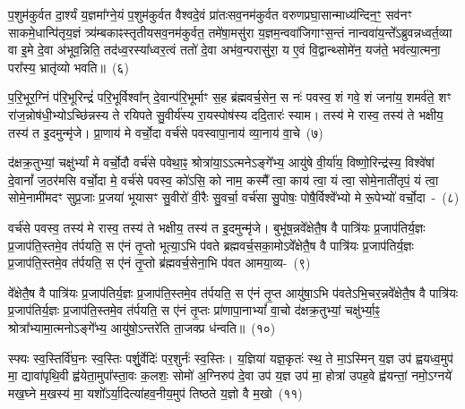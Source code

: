 प॒शुम॑कुर्वत दा॒र्श्यं य॒ज्ञमा᳚ग्ने॒यं प॒शुम॑कुर्वत वैश्वदे॒वं प्रा॑तःसव॒नम॑कुर्वत वरुणप्रघा॒सान्माध्य॑न्दिन॒ꣳ॒ सव॑नꣳ साक\-मे॒धान्पि॑तृय॒ज्ञं त्र्य॑म्बकाꣴस्तृतीयसव॒नम॑कुर्वत॒ तमे॑षा॒मसु॑रा य॒ज्ञम॒न्व\-वा॑जिगाꣳ\-स॒न्तं नान्ववा॑य॒न्ते᳚\-ऽब्रुवन्नध्वर्त॒व्या वा इ॒मे दे॒वा अ॑भूव॒न्निति॒ तद॑ध्व॒रस्या᳚ध्वर॒त्वं ततो॑ दे॒वा अभ॑व॒न्परासु॑रा॒ य ए॒वं वि॒द्वान्थ्सोमे॑न॒ यज॑ते॒ भव॑त्या॒त्मना॒ परा᳚स्य॒ भ्रातृ॑व्यो भवति॥~(६)

{\anuvakamend[{अप॑श्यन्तो\-ऽग्नीषो॒मीय॑मा॒त्मना॒ परा॒ त्रीणि॑ च}]}%

प॒रि॒भूर॒ग्निं प॑रि॒भूरिन्द्रं॑ परि॒भूर्विश्वा᳚न् दे॒वान्प॑रि॒भूर्माꣳ स॒ह ब्र॑ह्मवर्च॒सेन॒ स नः॑ पवस्व॒ शं गवे॒ शं जना॑य॒ शमर्व॑ते॒ शꣳ रा॑ज॒न्नोष॑धी॒भ्यो\-ऽच्छि॑न्नस्य ते रयिपते सु॒वीर्य॑स्य रा॒यस्पोष॑स्य ददि॒तारः॑ स्याम। तस्य॑ मे रास्व॒ तस्य॑ ते भक्षीय॒ तस्य॑ त इ॒दमुन्मृ॑जे। प्रा॒णाय॑ मे वर्चो॒दा वर्च॑से पवस्वापा॒नाय॑ व्या॒नाय॑ वा॒चे~(७)

द॑क्षक्र॒तुभ्यां॒ चक्षु॑र्भ्यां मे वर्चो॒दौ वर्च॑से पवेथा॒ꣴ॒ श्रोत्रा॑या॒\-ऽऽ\-\-त्मने\-ऽङ्गे᳚भ्य॒ आयु॑षे वी॒र्या॑य॒ विष्णो॒रिन्द्र॑स्य॒ विश्वे॑षां दे॒वानां᳚ ज॒ठर॑मसि वर्चो॒दा मे॒ वर्च॑से पवस्व॒ को॑\-ऽसि॒ को नाम॒ कस्मै᳚ त्वा॒ काय॑ त्वा॒ यं त्वा॒ सोमे॒नाती॑तृपं॒ यं त्वा॒ सोमे॒नामी॑मदꣳ सुप्र॒जाः प्र॒जया॑ भूयासꣳ सु॒वीरो॑ वी॒रैः सु॒वर्चा॒ वर्च॑सा सु॒पोषः॒ पोषै॒र्विश्वे᳚भ्यो मे रू॒पेभ्यो॑ वर्चो॒दा~-~(८)

वर्च॑से पवस्व॒ तस्य॑ मे रास्व॒ तस्य॑ ते भक्षीय॒ तस्य॑ त इ॒दमुन्मृ॑जे। बुभू॑ष॒न्नवे᳚क्षेतै॒ष वै पात्रि॑यः प्र॒जा\-प॑तिर्य॒ज्ञः प्र॒जा\-प॑ति॒स्तमे॒व त॑र्पयति॒ स ए॑नं तृ॒प्तो भूत्या॒\-ऽभि प॑वते ब्रह्मवर्च॒सका॒मो\-ऽवे᳚क्षेतै॒ष वै पात्रि॑यः प्र॒जा\-प॑तिर्य॒ज्ञः प्र॒जा\-प॑ति॒स्तमे॒व त॑र्पयति॒ स ए॑नं तृ॒प्तो ब्र॑ह्मवर्च॒सेना॒भि प॑वत आमया॒व्य-~(९)

वे᳚क्षेतै॒ष वै पात्रि॑यः प्र॒जा\-प॑तिर्य॒ज्ञः प्र॒जा\-प॑ति॒स्तमे॒व त॑र्पयति॒ स ए॑नं तृ॒प्त आयु॑षा॒\-ऽभि प॑वते\-ऽभि॒चर॒न्नवे᳚क्षेतै॒ष वै पात्रि॑यः प्र॒जा\-प॑तिर्य॒ज्ञः प्र॒जा\-प॑ति॒स्तमे॒व त॑र्पयति॒ स ए॑नं तृ॒प्तः प्रा॑णापा॒ना\-भ्यां᳚ वा॒चो द॑क्षक्र॒तुभ्यां॒ चक्षु॑र्भ्या॒ꣴ॒ श्रोत्रा᳚भ्यामा॒त्मनो\-ऽङ्गे᳚भ्य॒ आयु॑षो॒\-ऽन्तरे॑ति ता॒जक्प्र ध॑न्वति॥~(१०)

{\anuvakamend[{वा॒चे रू॒पेभ्यो॑ वर्चो॒दा आ॑मया॒वी पञ्च॑चत्वारिꣳशच्च}]}%

स्फ्यः स्व॒स्तिर्वि॑घ॒नः स्व॒स्तिः पर्\mbox{}शु॒र्वेदिः॑ पर॒शुर्नः॑ स्व॒स्तिः। य॒ज्ञिया॑ यज्ञ॒कृतः॑ स्थ॒ ते मा॒\-ऽस्मिन् य॒ज्ञ उप॑ ह्वयध्व॒मुप॑ मा॒ द्यावा॑\-पृथि॒वी ह्व॑येता॒मुपा᳚स्ता॒वः क॒लशः॒ सोमो॑ अ॒ग्निरुप॑ दे॒वा उप॑ य॒ज्ञ उप॑ मा॒ होत्रा॑ उपह॒वे ह्व॑यन्तां॒ नमो॒\-ऽग्नये॑ मख॒घ्ने म॒खस्य॑ मा॒ यशो᳚\-ऽर्या॒दित्या॑हव॒नीय॒मुप॑ तिष्ठते य॒ज्ञो वै म॒खो~(११)

